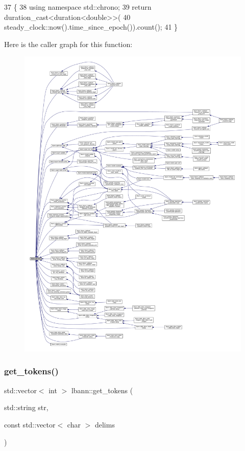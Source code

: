 \begin{DoxyCode}
37                          \{
38   \textcolor{keyword}{using namespace }std::chrono;
39   \textcolor{keywordflow}{return} duration\_cast<duration<double>>(
40            steady\_clock::now().time\_since\_epoch()).count();
41 \}
\end{DoxyCode}
Here is the caller graph for this function\+:\nopagebreak
\begin{figure}[H]
\begin{center}
\leavevmode
\includegraphics[width=350pt]{namespacelbann_a478d36031ff0659893c4322cd856157f_icgraph}
\end{center}
\end{figure}
\mbox{\label{namespacelbann_af3f2c9055423e1fe3380b1ad4c4ab5ef}} 
\subsubsection{\texorpdfstring{get\+\_\+tokens()}{get\_tokens()}\hspace{0.1cm}{\footnotesize\ttfamily [1/2]}}
{\footnotesize\ttfamily std\+::vector$<$ int $>$ lbann\+::get\+\_\+tokens (\begin{DoxyParamCaption}\item[{std\+::string}]{str,  }\item[{const std\+::vector$<$ char $>$}]{delims }\end{DoxyParamCaption})}



